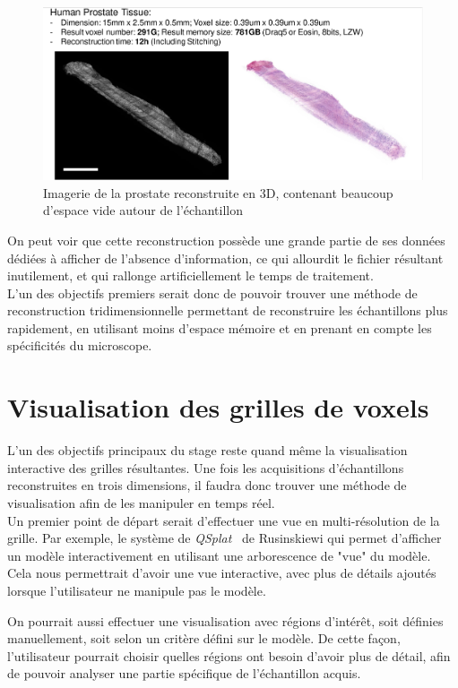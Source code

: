 \documentclass[utf8]{stageM2R}
\begin{document}
{{			\begin{figure}[H]
				\centering
				\includegraphics[width=0.8\linewidth]{./img/tulane_reconstruction_03_prostate.png}
				\caption{Imagerie de la prostate reconstruite en 3D, contenant beaucoup d'espace vide autour de l'échantillon}
				\label{ref_tulane_recon_03_prostate}
			\end{figure}

			On peut voir que cette reconstruction possède une grande partie de ses données dédiées à afficher de l'absence d'information, ce qui allourdit le fichier résultant inutilement, et qui rallonge artificiellement le temps de traitement.\\

			L'un des objectifs premiers serait donc de pouvoir trouver une méthode de reconstruction tridimensionnelle permettant de reconstruire les échantillons plus rapidement, en utilisant moins d'espace mémoire et en prenant en compte les spécificités du microscope.
		}
		\section{Visualisation des grilles de voxels}\label{section:03_02_solution}
		{
			L'un des objectifs principaux du stage reste quand même la visualisation interactive des grilles résultantes. Une fois les acquisitions d'échantillons reconstruites en trois dimensions, il faudra donc trouver une méthode de visualisation afin de les manipuler en temps réel.\\

			Un premier point de départ serait d'effectuer une vue en multi-résolution de la grille. Par exemple, le système de \textit{QSplat}~\cite{cite_visu_qsplat_system} de Rusinskiewi qui permet d'afficher un modèle interactivement en utilisant une arborescence de "vue" du modèle. Cela nous permettrait d'avoir une vue interactive, avec plus de détails ajoutés lorsque l'utilisateur ne manipule pas le modèle.

			On pourrait aussi effectuer une visualisation avec régions d'intérêt, soit définies manuellement, soit selon un critère défini sur le modèle. De cette façon, l'utilisateur pourrait choisir quelles régions ont besoin d'avoir plus de détail, afin de pouvoir analyser une partie spécifique de l'échantillon acquis.
		}
}
\end{document}
